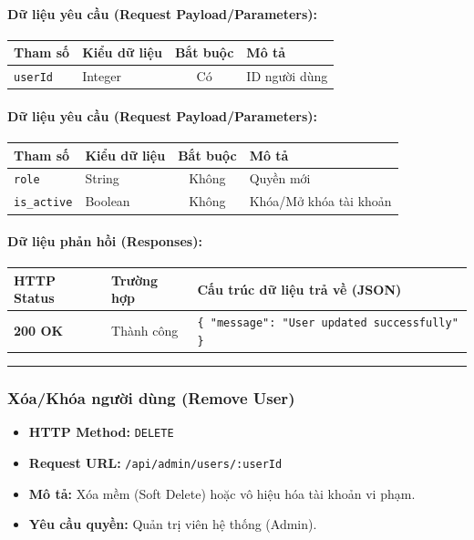 \documentclass[12pt,a4paper]{article}
\begin{document}
\paragraph{Dữ liệu yêu cầu (Request Payload/Parameters):}
\begin{longtable}{|>{\raggedright\arraybackslash}p{2.8cm}|>{\raggedright\arraybackslash}p{2.2cm}|c|>{\raggedright\arraybackslash}p{7.0cm}|}
\hline
\textbf{Tham số} & \textbf{Kiểu dữ liệu} & \textbf{Bắt buộc} & \textbf{Mô tả} \\ \hline
\endhead
\texttt{userId} & Integer & Có & ID người dùng \\ \hline
\end{longtable}

\paragraph{Dữ liệu yêu cầu (Request Payload/Parameters):}
\begin{longtable}{|>{\raggedright\arraybackslash}p{2.8cm}|>{\raggedright\arraybackslash}p{2.2cm}|c|>{\raggedright\arraybackslash}p{7.0cm}|}
\hline
\textbf{Tham số} & \textbf{Kiểu dữ liệu} & \textbf{Bắt buộc} & \textbf{Mô tả} \\ \hline
\endhead
\texttt{role} & String & Không & Quyền mới \\ \hline
\texttt{is\_active} & Boolean & Không & Khóa/Mở khóa tài khoản \\ \hline
\end{longtable}

\paragraph{Dữ liệu phản hồi (Responses):}
\begin{longtable}{|>{\raggedright\arraybackslash}p{2.8cm}|>{\raggedright\arraybackslash}p{3.2cm}|>{\raggedright\arraybackslash}p{8.0cm}|}
\hline
\textbf{HTTP Status} & \textbf{Trường hợp} & \textbf{Cấu trúc dữ liệu trả về (JSON)} \\ \hline
\endhead
\textbf{200 OK} & Thành công & \texttt{\{ "message": "User updated successfully" \}} \\ \hline
\end{longtable}

\vskip 0.4cm
\noindent\rule{\textwidth}{0.3pt}
\vskip 0.4cm

\subsubsection{Xóa/Khóa người dùng (Remove User)}
\begin{itemize}[leftmargin=*]
    \item \textbf{HTTP Method:} \texttt{DELETE}
    \item \textbf{Request URL:} \texttt{/api/admin/users/:userId}
    \item \textbf{Mô tả:} Xóa mềm (Soft Delete) hoặc vô hiệu hóa tài khoản vi phạm.
    \item \textbf{Yêu cầu quyền:} Quản trị viên hệ thống (Admin).
\end{itemize}
\end{document}
